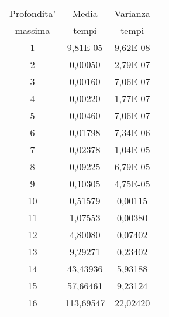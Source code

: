 \begin{tabular}{|c|c|c|c|}
\hline
Profondita' & Media & Varianza \\
massima & tempi & tempi \\
\hline

         1 &   9,81E-05 &   9,62E-08 \\

         2 &    0,00050 &   2,79E-07 \\

         3 &    0,00160 &   7,06E-07 \\

         4 &    0,00220 &   1,77E-07 \\

         5 &    0,00460 &   7,06E-07 \\

         6 &    0,01798 &   7,34E-06 \\

         7 &    0,02378 &   1,04E-05 \\

         8 &    0,09225 &   6,79E-05 \\

         9 &    0,10305 &   4,75E-05 \\

        10 &    0,51579 &    0,00115 \\

        11 &    1,07553 &    0,00380 \\

        12 &    4,80080 &    0,07402 \\

        13 &    9,29271 &    0,23402 \\

        14 &   43,43936 &    5,93188 \\

        15 &   57,66461 &    9,23124 \\

        16 &  113,69547 &   22,02420 \\
\hline

\end{tabular}  

